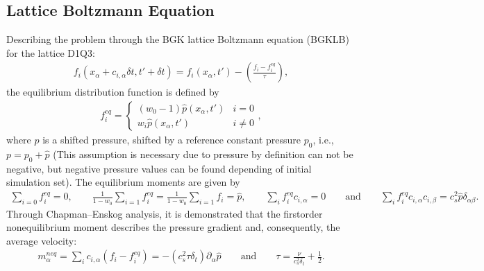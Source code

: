 \documentclass[letterpaper,10pt,english,openany,oneside]{jupyterBook}
\begin{document}
\subsection{Lattice Boltzmann Equation}
\label{\detokenize{LBM-Study/Poisson-Equation:lattice-boltzmann-equation}}
\sphinxAtStartPar
Describing the problem through the BGK lattice Boltzmann equation (BGK\sphinxhyphen{}LB) for the lattice D1Q3:
\begin{equation}\label{equation:LBM-Study/Poisson-Equation:LB-Poisson-Eq}
\begin{split}
f_i( x_{\alpha} + c_{i,\alpha} \delta t, t'+\delta t) = f_i(x_{\alpha}, t')  -\left( \frac{ f_{i} - f_{i}^{eq} }{ \tau } \right), 
\end{split}
\end{equation}
\sphinxAtStartPar
the equilibrium distribution function is defined by
\begin{equation*}
\begin{split}
f^{eq}_{i} = \left\{ \begin{array}{ll}
   \left(w_{0} - 1\right)\widehat{p}(x_{\alpha}, t')  & i=0 \\
   w_{i}\widehat{p}(x_{\alpha}, t')  & i\neq 0
\end{array} \right. ,
\end{split}
\end{equation*}
\sphinxAtStartPar
where \(\widehat{p}\) is a shifted pressure, shifted by a reference constant pressure \(p_{0}\), i.e., \(p=p_{0}+\widehat{p}\) (This assumption is necessary due to pressure by definition can not be negative, but negative pressure values can be found depending of initial simulation set). The equilibrium moments are given by
\begin{equation}\label{equation:LBM-Study/Poisson-Equation:moments-fi}
\begin{split}
\displaystyle\sum_{i=0} f_{i}^{eq}=0, \quad \quad \frac{1}{1-w_{0}}\displaystyle\sum_{i=1} f_{i}^{eq} = \frac{1}{1-w_{0}} \displaystyle\sum_{i=1} f_{i}=\widehat{p}, \quad \quad  \displaystyle\sum_{i}f_{i}^{eq} c_{i,\alpha} =0 \quad \quad \textrm{and} \quad \quad  \displaystyle\sum_{i}f_{i}^{eq} c_{i,\alpha} c_{i,\beta} =c_{s}^{2} \widehat{p} \delta_{\alpha\beta} .
\end{split}
\end{equation}
\sphinxAtStartPar
Through Chapman–Enskog analysis, it is demonstrated that the first\sphinxhyphen{}order non\sphinxhyphen{}equilibrium moment describes the pressure gradient and, consequently, the average velocity:
\begin{equation*}
\begin{split}
m^{neq}_{\alpha} = \displaystyle\sum_{i} c_{i,\alpha}\left( f_i-f_i^{eq}\right)  = -(c_{s}^{2} \tau \delta_{t})\partial_{\alpha}\widehat{p} \quad \quad \textrm{and} \quad\quad \tau = \displaystyle\frac{\nu}{c_{s}^{2} \delta_{t}} +\frac{1}{2}.
\end{split}
\end{equation*}
\end{document}

